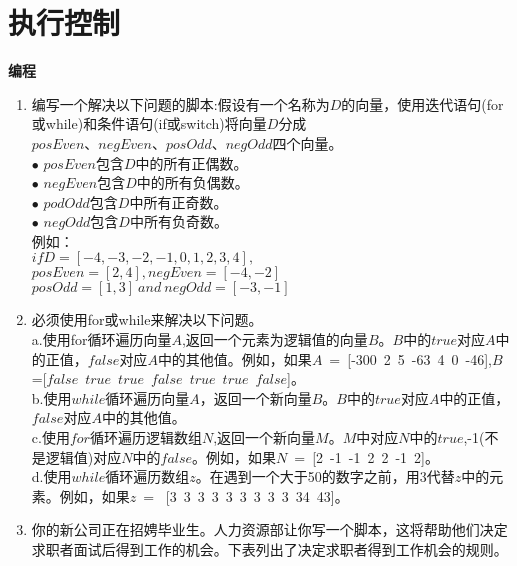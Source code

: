 \documentclass[UTF8]{ctexart}
\begin{document}
\section{执行控制}
\textbf{编程}
\begin{enumerate}
	\item 编写一个解决以下问题的脚本:假设有一个名称为$D$的向量，使用迭代语句(for或while)和条件语句(if或switch)将向量$D$分成$posEven\text{、}negEven\text{、}posOdd\text{、}negOdd$四个向量。
	\\ $\bullet$ $posEven$包含$D$中的所有正偶数。
	\\ $\bullet$ $negEven$包含$D$中的所有负偶数。
	\\ $\bullet$ $podOdd$包含$D$中所有正奇数。
	\\ $\bullet$ $negOdd$包含$D$中所有负奇数。
	\\例如：\\
	$if D = [-4,-3,-2,-1,0,1,2,3,4],$\\
	$posEven=[2,4],negEven=[-4,-2]$\\
	$posOdd=[1,3]\ and\ negOdd=[-3,-1]$
	\item 必须使用for或while来解决以下问题。\\
	a.使用for循环遍历向量$A$,返回一个元素为逻辑值的向量$B$。$B$中的$true$对应$A$中的正值，$false$对应$A$中的其他值。例如，如果$A$\ =\ [-300\ 2\ 5\ -63\ 4\ 0\ -46],$B$=[$false$\ $true$\ $true$\ $false$\ $true$\ $true$\ $false$]。\\
	b.使用$while$循环遍历向量$A$，返回一个新向量$B$。$B$中的$true$对应$A$中的正值，$false$对应$A$中的其他值。\\
	c.使用$for$循环遍历逻辑数组$N$,返回一个新向量$M$。$M$中对应$N$中的$true$,-1(不是逻辑值)对应$N$中的$false$。例如，如果$N$\ =\ [2\ -1\ -1\ 2\ 2\ -1\ 2]。\\
	d.使用$while$循环遍历数组$z$。在遇到一个大于50的数字之前，用3代替$z$中的元素。例如，如果$z$\ = \ [3\ 3\ 3\ 3\ 3\ 3\ 3\ 3\ 3\ 34\ 43]。
	\item 你的新公司正在招娉毕业生。人力资源部让你写一个脚本，这将帮助他们决定求职者面试后得到工作的机会。下表列出了决定求职者得到工作机会的规则。
	\begin{table}[H]
		

\end{table}
\end{enumerate}
\end{document}
